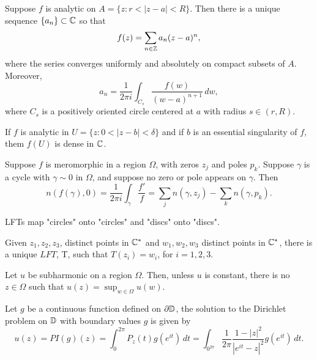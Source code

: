 \documentclass[12pt]{article}
\begin{document}
\begin{theorem}[Laurent]
    Suppose $f$ is analytic on $A=\{z:r<|z-a|<R\}$. Then there is a unique sequence $\{a_n\}\subset\mathbb{C}$ so that
    \begin{equation*}
        f(z)=\sum_{n\in\mathbb{Z}} a_n(z-a)^n,
    \end{equation*}
    where the series converges uniformly and absolutely on compact subsets of $A$. Moreover, 
    \begin{equation*}
        a_n=\frac{1}{2\pi i}\int_{C_s} \frac{f(w)}{(w-a)^{n+1}}\,dw,
    \end{equation*}
    where $C_s$ is a positively oriented circle centered at $a$ with radius $s\in(r,R)$.
\end{theorem}

\begin{theorem}
    If $f$ is analytic in $U=\{z:0<|z-b|<\delta\}$ and if $b$ is an essential singularity of $f$, them $f(U)$ is dense in $\mathbb{C}$.
\end{theorem}

\begin{theorem}
    Suppose $f$ is meromorphic in a region $\Omega$, with zeros $z_j$ and poles $p_k$. Suppose $\gamma$ is a cycle with $\gamma\sim 0$ in $\Omega$, and suppose no zero or pole appears on $\gamma$. Then
    \begin{equation*}
        n(f(\gamma),0)=\frac{1}{2\pi i}\int_\gamma\frac{f'}{f} = \sum_j n(\gamma,z_j)-\sum_k n(\gamma,p_k).
    \end{equation*}
\end{theorem}

\begin{theorem}
    LFTs map "circles" onto "circles" and "discs" onto "discs".
\end{theorem}

\begin{theorem}
    Given $z_1,z_2,z_3$, distinct points in $\mathbb{C}^*$ and $w_1,w_2,w_3$ distinct points in $\mathbb{C}^*$, there is a unique $LFT$, T, such that $T(z_i)=w_i$, for $i=1,2,3$.
\end{theorem}

\begin{theorem}
    Let $u$ be subharmonic on a region $\Omega$. Then, unless $u$ is constant, there is no $z\in\Omega$ such that $u(z)=\sup_{w\in\Omega}u(w)$.
\end{theorem}

\begin{theorem}
    Let $g$ be a continuous function defined on $\partial\mathbb{D}$, the solution to the Dirichlet problem on $\mathbb{D}$ with boundary values $g$ is given by
    \begin{equation*}
        u(z)=PI(g)(z)=\int_0^{2\pi} P_z(t)g(e^{it})\,dt=\int_{0^{2\pi}}\frac{1}{2\pi}\frac{1-|z|^2}{|e^{it}-z|^2}g(e^{it})\,dt.
    \end{equation*}
\end{theorem}
\end{document}
